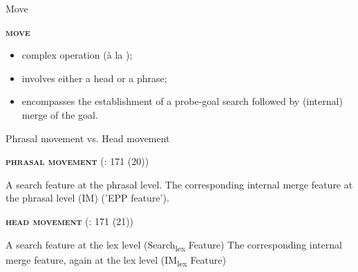 \documentclass[lesson_slides]{subfiles}
\begin{document}
\begin{frame}[c]{Move}

    \noindent\textbf{\textsc{move}} 
    \begin{itemize}
        \item[\ding{227}] complex operation (à la \citealt{chomsky2001});
        \item[\ding{227}] involves either a head or a phrase;
        \item[\ding{227}] encompasses the establishment of a probe-goal search followed by (internal) merge of the goal. 
    \end{itemize}
        
\end{frame}
\begin{frame}[c]{Phrasal movement vs. Head movement}

    \noindent\textbf{\textsc{phrasal movement}} (\citealt{rizzi2017}: 171 (20))
        \begin{xlist}
            \ex A search feature at the phrasal level.
            \ex The corresponding internal merge feature at the phrasal level (IM) ('EPP feature').
        \end{xlist}

    \noindent\textbf{\textsc{head movement}} (\citealt{rizzi2017}: 171 (21)) 
        \begin{xlist}
            \ex A search feature at the lex level (Search\textsubscript{lex} Feature)
            \ex The corresponding internal merge feature, again at the lex level (IM\textsubscript{lex} Feature)
        \end{xlist}
        
\end{frame}
\end{document}

